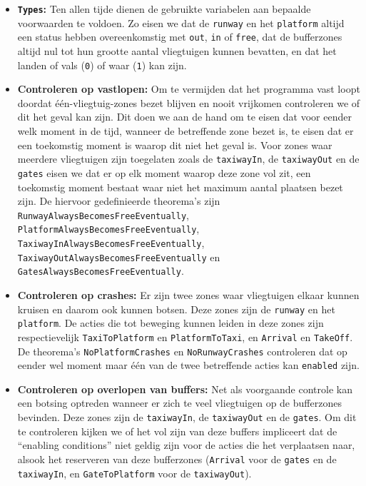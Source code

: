 \begin{itemize}
\item \textbf{\texttt{Types}:} Ten allen tijde dienen de gebruikte variabelen aan bepaalde voorwaarden te voldoen. Zo eisen we dat de \texttt{runway} en het \texttt{platform} altijd een status hebben overeenkomstig met \texttt{out}, \texttt{in} of \texttt{free}, dat de bufferzones altijd nul tot hun grootte aantal vliegtuigen kunnen bevatten, en dat het landen of vals (\texttt{0}) of waar (\texttt{1}) kan zijn.

\item \textbf{Controleren op vastlopen:} Om te vermijden dat het programma vast loopt doordat één-vliegtuig-zones bezet blijven en nooit vrijkomen controleren we of dit het geval kan zijn. Dit doen we aan de hand om te eisen dat voor eender welk moment in de tijd, wanneer de betreffende zone bezet is, te eisen dat er een toekomstig moment is waarop dit niet het geval is. Voor zones waar meerdere vliegtuigen zijn toegelaten zoals de \texttt{taxiwayIn}, de \texttt{taxiwayOut} en de \texttt{gates} eisen we dat er op elk moment waarop deze zone vol zit, een toekomstig moment bestaat waar niet het maximum aantal plaatsen bezet zijn. De hiervoor gedefinieerde theorema's zijn \texttt{RunwayAlwaysBecomesFreeEventually}, \texttt{PlatformAlwaysBecomesFreeEventually}, \newline \texttt{TaxiwayInAlwaysBecomesFreeEventually}, \texttt{TaxiwayOutAlwaysBecomesFreeEventually} en \texttt{GatesAlwaysBecomesFreeEventually}.

\item \textbf{Controleren op crashes:} Er zijn twee zones waar vliegtuigen elkaar kunnen kruisen en daarom ook kunnen botsen. Deze zones zijn de \texttt{runway} en het \texttt{platform}. De acties die tot beweging kunnen leiden in deze zones zijn respectievelijk \texttt{TaxiToPlatform} en \texttt{PlatformToTaxi}, en \texttt{Arrival} en \texttt{TakeOff}. De theorema's \texttt{NoPlatformCrashes} en \texttt{NoRunwayCrashes} controleren dat op eender wel moment maar één van de twee betreffende acties kan \texttt{enabled} zijn.

\item \textbf{Controleren op overlopen van buffers:} Net als voorgaande controle kan een botsing optreden wanneer er zich te veel vliegtuigen op de bufferzones bevinden. Deze zones zijn de \texttt{taxiwayIn}, de \texttt{taxiwayOut} en de \texttt{gates}. Om dit te controleren kijken we of het vol zijn van deze buffers impliceert dat de ``enabling conditions'' niet geldig zijn voor de acties die het verplaatsen naar, alsook het reserveren van deze bufferzones (\texttt{Arrival} voor de \texttt{gates} en de \texttt{taxiwayIn}, en \texttt{GateToPlatform} voor de \texttt{taxiwayOut}).
\end{itemize}

